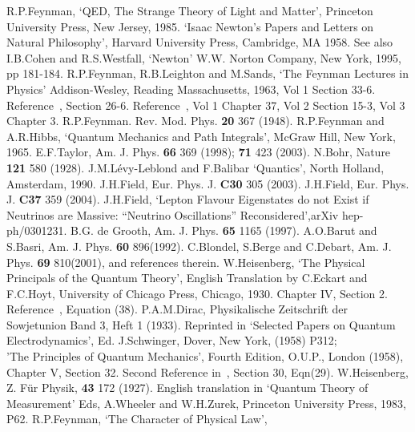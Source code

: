\documentclass [12pt]{article}
\begin{document}
{\begin{thebibliography}{99}
 R.P.Feynman, `QED, The Strange Theory of Light and Matter',
 Princeton University Press, New Jersey, 1985.
  `Isaac Newton's Papers and Letters on Natural Philosophy', 
 Harvard University Press, Cambridge, MA 1958. See also
 I.B.Cohen and R.S.Westfall, `Newton' W.W. Norton Company, New York, 1995, pp  181-184.
 R.P.Feynman, R.B.Leighton and M.Sands, `The Feynman Lectures in Physics'
 Addison-Wesley, Reading Massachusetts, 1963, Vol 1 Section 33-6.
 Reference~\cite{Feyn2}, Section 26-6.
 Reference~\cite{Feyn2}, Vol 1 Chapter 37, Vol 2 Section 15-3, Vol 3 Chapter 3.
  R.P.Feynman. Rev. Mod. Phys. {\bf 20} 367 (1948).
   R.P.Feynman and A.R.Hibbs, `Quantum Mechanics and Path Integrals',
  McGraw Hill, New York, 1965.
 E.F.Taylor, Am. J. Phys. {\bf 66} 369 (1998); {\bf 71} 423 (2003).
  N.Bohr, Nature {\bf 121} 580 (1928). 
 J.M.L\'{e}vy-Leblond and F.Balibar `Quantics',
 North Holland, Amsterdam, 1990. 
  J.H.Field, Eur. Phys. J. {\bf C30} 305 (2003).
 J.H.Field, Eur. Phys. J. {\bf C37} 359 (2004).
 J.H.Field, `Lepton Flavour Eigenstates do not Exist if Neutrinos are Massive:
   ``Neutrino Oscillations''  Reconsidered',arXiv hep-ph/0301231.
 B.G. de Grooth,  Am. J. Phys. {\bf 65} 1165 (1997).
 A.O.Barut and S.Basri,  Am. J. Phys. {\bf 60} 896(1992).
  C.Blondel, S.Berge and C.Debart, Am. J. Phys. {\bf 69} 810(2001),
 and references therein.
W.Heisenberg, `The Physical Principals of the Quantum Theory',
 English Translation by C.Eckart and F.C.Hoyt, University of Chicago Press,
 Chicago, 1930. Chapter IV, Section 2.
 Reference~\cite{Feyn5}, Equation (38).
  P.A.M.Dirac, Physikalische Zeitschrift der Sowjetunion Band 3, Heft 1 (1933).
 Reprinted in `Selected Papers on Quantum Electrodynamics',
  Ed. J.Schwinger, Dover, New York, (1958) P312; \\
 'The Principles of Quantum Mechanics',
 Fourth Edition, O.U.P., London (1958), Chapter V, Section 32.
Second Reference in~\cite{Dirac1}, Section 30, Eqn(29).
W.Heisenberg, Z. F\"{u}r Physik, {\bf 43} 172 (1927).
 English translation in `Quantum Theory of Measurement'
 Eds, A.Wheeler and W.H.Zurek, Princeton University Press, 1983, P62.
 R.P.Feynman, `The Character of Physical Law',

\end{thebibliography}}
\end{document}
